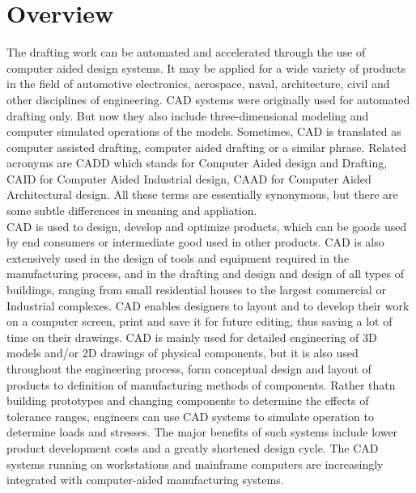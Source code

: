 \section{Overview}
The drafting work can be automated and accelerated through the use of computer aided design systems. It may be applied for a wide variety of products in the field of automotive electronics, aerospace, naval, architecture, civil and other disciplines of engineering. CAD systems were originally used for automated drafting only. But now they also include three-dimensional modeling and computer simulated operations of the models. Sometimes, CAD is translated as computer assisted drafting, computer aided drafting or a similar phrase. Related acronyms are CADD which stands for Computer Aided design and Drafting, CAID for Computer Aided Industrial design, CAAD for Computer Aided Architectural design. All these terms are essentially synonymous, but there are some subtle differences in meaning and appliation.\\

\noindent CAD is used to design, develop and optimize products, which can be goods used by end consumers or intermediate good used in other products. CAD is also extensively used in the design of tools and equipment required in the manufacturing process, and in the drafting and design and design of all types of buildings, ranging from small residential houses to the largest commercial or Industrial complexes. CAD enables designers to layout and to develop their work on a computer screen, print and save it for future editing, thus saving a lot of time on their drawings. CAD is mainly used for detailed engineering of 3D models and/or 2D drawings of physical components, but it is also used throughout the engineering process, form conceptual design and layout of products to definition of manufacturing methods of components. Rather thatn building prototypes and changing components to determine the effects of tolerance ranges, engineers can use CAD systems to simulate operation to determine loads and stresses. The major benefits of such systems include lower product development costs and a greatly shortened design cycle. The CAD systems running on workstations and mainframe computers are increasingly integrated with computer-aided manufacturing systems.



